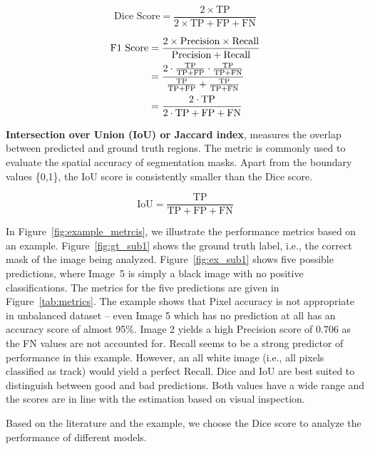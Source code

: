 \documentclass[Master,MDS,english]{BASE/twbook} %
\begin{document}
\[
\text{Dice Score} = \frac{2 \times \text{TP}}{2 \times \text{TP} + \text{FP} + \text{FN}}
\]

\begin{align*}
    \text{F1 Score} &= \frac{2 \times \text{Precision} \times \text{Recall}}{\text{Precision} + \text{Recall}} \\
    \vspace{1em}
     &= \frac{2 \cdot \frac{\text{TP}}{\text{TP} + \text{FP}} \cdot \frac{\text{TP}}{\text{TP} + \text{FN}}}{\frac{\text{TP}}{\text{TP} + \text{FP}} + \frac{\text{TP}}{\text{TP} + \text{FN}}} \\
    \vspace{1em}
     &= \frac{2 \cdot \text{TP}}{2 \cdot \text{TP} + \text{FP} + \text{FN}}
\end{align*}


\vspace{1cm}

\noindent\textbf{Intersection over Union (IoU) or Jaccard index}, measures the overlap between predicted and ground truth regions. The metric is commonly used to evaluate the spatial accuracy of segmentation masks. Apart from the boundary values \{0,1\}, the IoU score is consistently smaller than the Dice score.

\[
\text{IoU} = \frac{\text{TP}}{\text{TP} + \text{FP} + \text{FN}}
\]


In Figure~\ref{fig:example_metrcis}, we illustrate the performance metrics based on an example. Figure~\ref{fig:gt_sub1} shows the ground truth label, i.e., the correct mask of the image being analyzed. Figure~\ref{fig:ex_sub1} shows five possible predictions, where Image~5 is simply a black image with no positive classifications. The metrics for the five predictions are given in Figure~\ref{tab:metrics}. The example shows that Pixel accuracy is not appropriate in unbalanced dataset -- even Image 5 which has no prediction at all has an accuracy score of almost 95\%. Image 2 yields a high Precision score of 0.706 as the FN values are not accounted for.  Recall seems to be a strong predictor of performance in this example. However, an all white image (i.e., all pixels classified as track) would yield a perfect Recall. Dice and IoU are best suited to distinguish between good and bad predictions. Both values have a wide range and the scores are in line with the estimation based on visual inspection.

Based on the literature and the example, we choose the Dice score to analyze the performance of different models.
\end{document}
